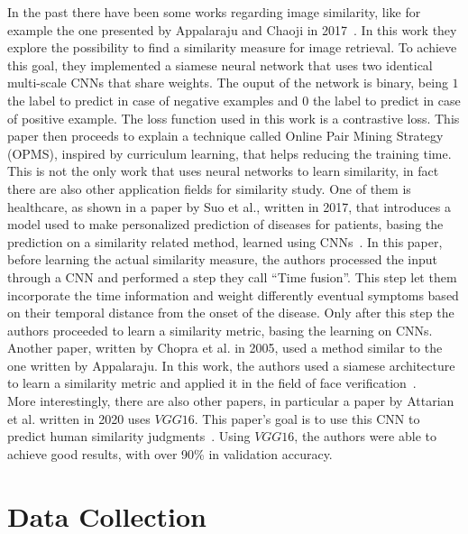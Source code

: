 \documentclass[conference]{IEEEtran}
\begin{document}
			In the past there have been some works regarding image similarity, like for example the one presented by Appalaraju and Chaoji in 2017~\cite{appalaraju2017image}. In this work they explore the possibility to 
			find a similarity measure for image retrieval. To achieve this goal, they implemented a siamese neural network that uses two identical multi-scale CNNs that share weights. The ouput of the 
			network is binary, being $1$ the label to predict in case of negative examples and $0$ the label to predict in case of positive example. The loss function used in this work is a contrastive loss. This paper 
			then proceeds to explain a technique called Online Pair Mining Strategy (OPMS), inspired by curriculum learning, that helps reducing the training time. \\
			This is not the only work that uses neural networks to learn similarity, in fact there are also other application fields for similarity study. One of them is healthcare, as shown in a paper by Suo et al., written in 
			2017, that introduces a model used to make personalized prediction of diseases for patients, basing the prediction on a similarity related method, learned using CNNs~\cite{8217759}. In this paper, before 
			learning the actual similarity measure, the authors processed the input through a CNN and performed a step they call ``Time fusion''. This step let them incorporate the time information and 
			weight differently eventual symptoms based on their temporal distance from the onset of the disease. Only after this step the authors proceeded to learn a similarity metric, basing the learning 
			on CNNs.\\
			Another paper, written by Chopra et al. in 2005, used a method similar to the one written by Appalaraju. In this work, the authors used a siamese architecture to learn a similarity metric and applied it 
			in the field of face verification~\cite{chopra2005learning}.\\
			More interestingly, there are also other papers, in particular a paper by Attarian et al. written in 2020 uses $VGG16$. This paper's goal is to use this CNN to predict human similarity 
			judgments~\cite{attarian2020transforming}. Using $VGG16$, the authors were able to achieve good results, with over 90\% in validation accuracy.
			
\section{Data Collection}
\end{document}

